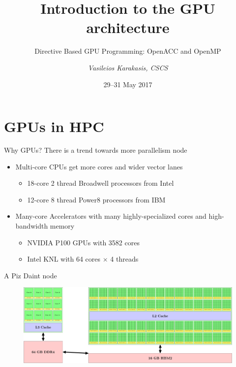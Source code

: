 \documentclass[aspectratio=169,12pt]{beamer}
\author{\emph{Vasileios Karakasis, CSCS}}
\title{Introduction to the GPU architecture}
\subtitle{Directive Based GPU Programming: OpenACC and OpenMP}
\date{29--31 May 2017}
\begin{document}
\cscstitle


\part{GPUs in HPC}

\begin{frame}{Why GPUs?}
  There is a trend towards more parallelism node
  \vfill
  \begin{itemize}
    \item Multi-core CPUs get more cores and wider vector lanes
      \begin{itemize}
      \item 18-core 2 thread Broadwell processors from Intel
      \item 12-core 8 thread Power8 processors from IBM
      \end{itemize}
    \item Many-core Accelerators with many highly-specialized cores and high-bandwidth memory
      \begin{itemize}
      \item NVIDIA P100 GPUs with 3582 cores
      \item Intel KNL with 64 cores $\times$ 4 threads
      \end{itemize}
  \end{itemize}
\end{frame}

\begin{frame}{A Piz Daint node}
  \begin{figure}
    \centering
    \includegraphics[width=\textwidth]{pizdaint_node}
  \end{figure}
\end{frame}
\end{document}
